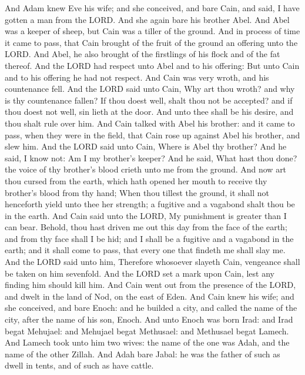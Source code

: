 \begin{biblechapter} %
\verse And Adam knew Eve his wife; and she conceived, and bare Cain, and said, I have gotten a man from the LORD.
\verse And she again bare his brother Abel. And Abel was a keeper of sheep, but Cain was a tiller of the ground.
\verse And in process of time it came to pass, that Cain brought of the fruit of the ground an offering unto the LORD.
\verse And Abel, he also brought of the firstlings of his flock and of the fat thereof. And the LORD had respect unto Abel and to his offering:
\verse But unto Cain and to his offering he had not respect. And Cain was very wroth, and his countenance fell.
\verse And the LORD said unto Cain, Why art thou wroth? and why is thy countenance fallen?
\verse If thou doest well, shalt thou not be accepted? and if thou doest not well, sin lieth at the door. And unto thee shall be his desire, and thou shalt rule over him.
\verse And Cain talked with Abel his brother: and it came to pass, when they were in the field, that Cain rose up against Abel his brother, and slew him.
\verse And the LORD said unto Cain, Where is Abel thy brother? And he said, I know not: Am I my brother's keeper?
\verse And he said, What hast thou done? the voice of thy brother's blood crieth unto me from the ground.
\verse And now art thou cursed from the earth, which hath opened her mouth to receive thy brother's blood from thy hand;
\verse When thou tillest the ground, it shall not henceforth yield unto thee her strength; a fugitive and a vagabond shalt thou be in the earth.
\verse And Cain said unto the LORD, My punishment is greater than I can bear.
\verse Behold, thou hast driven me out this day from the face of the earth; and from thy face shall I be hid; and I shall be a fugitive and a vagabond in the earth; and it shall come to pass, that every one that findeth me shall slay me.
\verse And the LORD said unto him, Therefore whosoever slayeth Cain, vengeance shall be taken on him sevenfold. And the LORD set a mark upon Cain, lest any finding him should kill him.
\verse And Cain went out from the presence of the LORD, and dwelt in the land of Nod, on the east of Eden.
\verse And Cain knew his wife; and she conceived, and bare Enoch: and he builded a city, and called the name of the city, after the name of his son, Enoch.
\verse And unto Enoch was born Irad: and Irad begat Mehujael: and Mehujael begat Methusael: and Methusael begat Lamech.
\verse And Lamech took unto him two wives: the name of the one was Adah, and the name of the other Zillah.
\verse And Adah bare Jabal: he was the father of such as dwell in tents, and of such as have cattle.

\end{biblechapter}
